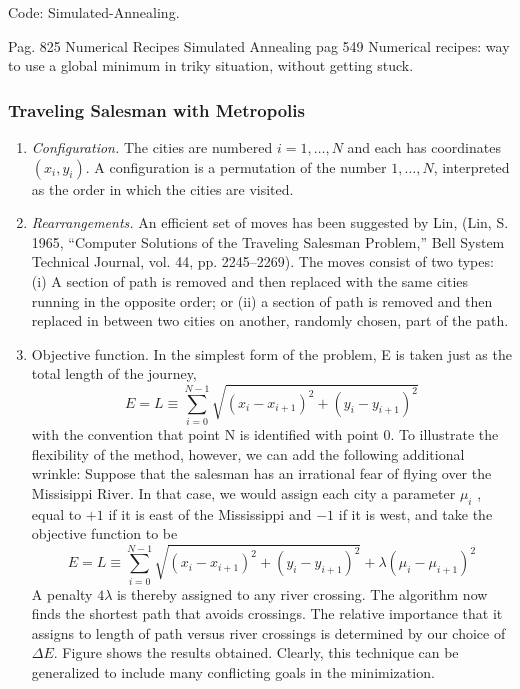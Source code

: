 Code: Simulated-Annealing.

Pag. 825 Numerical Recipes 
Simulated Annealing pag 549 Numerical recipes: way to use a global minimum in triky situation, without getting stuck.

\subsubsection{Traveling Salesman with Metropolis}

\begin{enumerate}
\item \textit{Configuration.} The cities are numbered $i = 1,\dots,N$ and each has coordinates $(x_i,y_i)$. A configuration is a permutation of the number $1,\dots,N$, interpreted as the order in which the cities are visited.
\item \textit{Rearrangements.} An efficient set of moves has been suggested by Lin, (Lin, S. 1965, “Computer Solutions of the Traveling Salesman Problem,” Bell System Technical Journal, vol. 44, pp. 2245–2269). The moves consist of two types: (i) A section of path is removed and then replaced with the same cities running in the opposite order; or (ii) a section of path is removed and then replaced in between two cities on another, randomly chosen, part of the path.
\item Objective function. In the simplest form of the problem, E is taken just as the total length of the journey,
\[ E = L \equiv \sum_{i=0}^{N-1} \sqrt{(x_i-x_{i+1})^2+(y_i-y_{i+1})^2}  \]
with the convention that point N is identified with point 0. To illustrate the flexibility of the method, however, we can add the following additional wrinkle: Suppose that the salesman has an irrational fear of flying over the Missisippi River. In that case, we would assign each city a parameter $\mu_i$ , equal to $+1$ if it is east of the Mississippi and $-1$ if it is west, and take the objective function to be
\[ E = L \equiv \sum_{i=0}^{N-1} \sqrt{(x_i-x_{i+1})^2+(y_i-y_{i+1})^2} + \lambda(\mu_i - \mu_{i+1})^2 \]
A penalty $4 \lambda $ is thereby assigned to any river crossing. The algorithm now finds the shortest path that avoids crossings. The relative importance that it assigns to length of path versus river crossings is determined by our choice of $\Delta E$. Figure  shows the results obtained. Clearly, this technique can be
generalized to include many conflicting goals in the minimization.

\end{enumerate}
